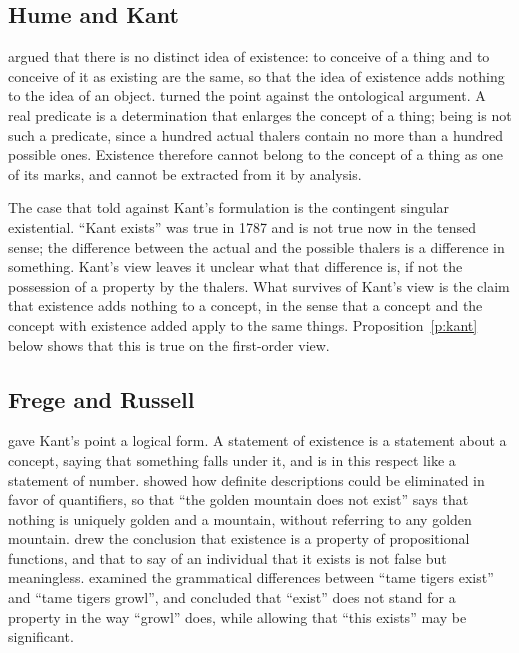 \documentclass{situationist-preprint}
\begin{document}
\subsection{Hume and Kant}

\citet[1.2.6]{Hume1739} argued that there is no distinct idea of existence: to conceive of a thing and to conceive of it as existing are the same, so that the idea of existence adds nothing to the idea of an object. \citet[A598/B626]{Kant1787} turned the point against the ontological argument. A real predicate is a determination that enlarges the concept of a thing; being is not such a predicate, since a hundred actual thalers contain no more than a hundred possible ones. Existence therefore cannot belong to the concept of a thing as one of its marks, and cannot be extracted from it by analysis.

The case that told against Kant's formulation is the contingent singular existential. \enquote{Kant exists} was true in 1787 and is not true now in the tensed sense; the difference between the actual and the possible thalers is a difference in something. Kant's view leaves it unclear what that difference is, if not the possession of a property by the thalers. What survives of Kant's view is the claim that existence adds nothing to a concept, in the sense that a concept and the concept with existence added apply to the same things. Proposition~\ref{p:kant} below shows that this is true on the first-order view.

\subsection{Frege and Russell}

\citet[\S 53]{Frege1884} gave Kant's point a logical form. A statement of existence is a statement about a concept, saying that something falls under it, and is in this respect like a statement of number. \citet{Russell1905} showed how definite descriptions could be eliminated in favor of quantifiers, so that \enquote{the golden mountain does not exist} says that nothing is uniquely golden and a mountain, without referring to any golden mountain. \citet{Russell1918} drew the conclusion that existence is a property of propositional functions, and that to say of an individual that it exists is not false but meaningless. \citet{Moore1936} examined the grammatical differences between \enquote{tame tigers exist} and \enquote{tame tigers growl}, and concluded that \enquote{exist} does not stand for a property in the way \enquote{growl} does, while allowing that \enquote{this exists} may be significant.
\end{document}
